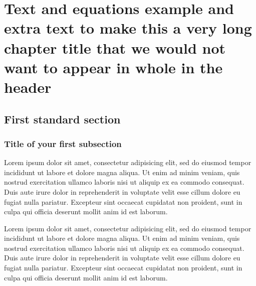 \chapter[Text and equations example]{Text and equations example and extra text to make this a very long chapter title that we would not want to
appear in whole in the header}

\section{First standard section}

\subsection{Title of your first subsection}

Lorem ipsum dolor sit amet, consectetur adipisicing elit, sed do eiusmod tempor incididunt ut labore et dolore magna aliqua. Ut enim ad minim veniam,
quis nostrud exercitation ullamco laboris nisi ut aliquip ex ea commodo consequat. Duis aute irure dolor in reprehenderit in voluptate velit esse
cillum dolore eu fugiat nulla pariatur. Excepteur sint occaecat cupidatat non proident, sunt in culpa qui officia deserunt mollit anim id est laborum.

Lorem ipsum dolor sit amet, consectetur adipisicing elit, sed do eiusmod tempor incididunt ut labore et dolore magna aliqua. Ut enim ad minim veniam,
quis nostrud exercitation ullamco laboris nisi ut aliquip ex ea commodo consequat. Duis aute irure dolor in reprehenderit in voluptate velit esse
cillum dolore eu fugiat nulla pariatur. Excepteur sint occaecat cupidatat non proident, sunt in culpa qui officia deserunt mollit anim id est laborum.

